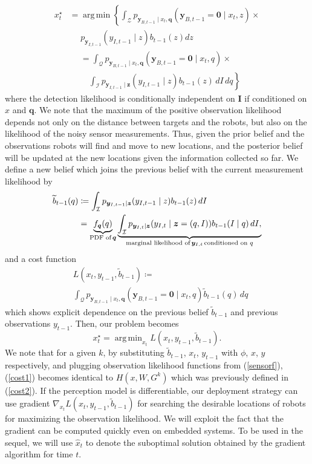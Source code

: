 \documentclass[journal]{IEEEtran}
\DeclareMathOperator*{\argmin}{arg\,min}
\begin{document}
\begin{align*}
{x}_t^{\star} &= \argmin \left\{
\int_\mathcal{Z} 
p_{\bm{y}_{B,t-1}\mid x_t,\bm{q}}(\bm{y}_{B,t-1}=\mathbf{0} \mid x_t,z) \times \right.\\
&\,\,\,\,\,\,\,\,p_{\bm{y}_{I,t-1}}(y_{I,t-1} \mid z)b_{t-1}(z)
dz 
\end{align*}
\begin{align*}
&=  \int_{\mathcal{Q}}
p_{\bm{y}_{B,t-1}\mid x_t,\bm{q}}(\bm{y}_{B,t-1}=\mathbf{0} \mid x_t,q) \times \\
&\,\,\,\,\,\,\left.\int_{\mathcal{I}} 
p_{\bm{y}_{I,t-1}\mid \bm{z}}(y_{I,t-1} \mid z)b_{t-1}(z)
\,dI\,dq \right\}
\end{align*}
where the detection likelihood is conditionally independent on $\bm{I}$ if conditioned on $x$ and $\bm{q}$.
We note that the maximum of the positive observation likelihood depends not only on the distance between targets and the robots, but also on the likelihood of the noisy sensor measurements.
Thus, given the prior belief and the observations robots will find and move to new locations, and the posterior belief will be updated at the new locations given the information collected so far.
We define a new belief which joins the previous belief with the current measurement likelihood by
\begin{align*}
\widetilde{b}_{t-1}(q)
&\coloneqq \int_{\mathcal{I}} 
p_{\bm{y}_{I,t-1}\mid \bm{z}}(y_{I,t-1} \mid z)b_{t-1}(z)\,
dI \\
&=
\underbrace{f_{\bm{q}}(q)}_{\textup{PDF of}\,\bm{q}}\underbrace{\int_{\mathcal{I}} p_{\bm{y}_{I,t} \mid \bm{z}}(y_{I,t}\mid \bm{z} = (q,I))b_{t-1}(I \mid q)\,dI,}_{\textup{marginal likelihood of}\,\bm{y}_{I,t}\,\textup{conditioned on }q}
\end{align*} 
and a cost function 
\begin{align}
&L(x_t,y_{t-1},\widetilde{b}_{t-1})\coloneqq \nonumber \\
&\int_{\mathcal{Q}}
p_{\bm{y}_{B,t-1} \mid
	{x}_{t},\bm{q}}\left(
\bm{y}_{B,t-1} = \bm{0} \mid
{x}_{t},q\right)
\widetilde{b}_{t-1}(q)
\,dq
\label{cost1}
\end{align}
which shows explicit dependence on the previous belief $\tilde{b}_{t-1}$ and previous observations $y_{t-1}$. 
Then, our problem becomes 
\begin{equation}
{x}_t^{\star} = \argmin_{x_t} L(x_t,y_{t-1},\widetilde{b}_{t-1}).
\label{mmle}
\end{equation}
We note that for a given $k$, by substituting $\widetilde{b}_{t-1}$, $x_t$, $y_{t-1}$ with $\phi$, $x$, $y$ respectively, and plugging observation likelihood functions from (\ref{sensorf}), (\ref{cost1}) becomes identical to $H(x,W,G^k)$ which was previously defined in (\ref{cost2}).
If the perception model is differentiable, our deployment strategy can use gradient
$
\nabla_{x_t} L(x_t,y_{t-1},\widetilde{b}_{t-1})
$
for searching the desirable locations of robots for maximizing the observation likelihood.  We will exploit the fact that the gradient can be computed quickly even on embedded systems. 
To be used in the sequel, we will use $\hat{x}_t$ to denote the suboptimal solution obtained by the gradient algorithm for time $t$.
\end{document}
